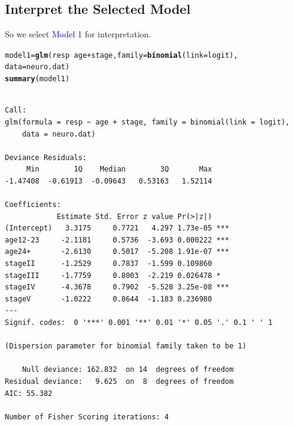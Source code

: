\documentclass{article}\usepackage[]{graphicx}\usepackage[svgnames]{xcolor}
\makeatletter
\newcommand{\hlopt}[1]{\textcolor[rgb]{0,0,0}{#1}}%
\newcommand{\hlstd}[1]{\textcolor[rgb]{0.345,0.345,0.345}{#1}}%
\newcommand{\hlkwb}[1]{\textcolor[rgb]{0.69,0.353,0.396}{#1}}%
\newcommand{\hlkwc}[1]{\textcolor[rgb]{0.333,0.667,0.333}{#1}}%
\newcommand{\hlkwd}[1]{\textcolor[rgb]{0.737,0.353,0.396}{\textbf{#1}}}%
\newenvironment{kframe}{%
 \def\at@end@of@kframe{}%
 \ifinner\ifhmode%
  \def\at@end@of@kframe{\end{minipage}}%
  \begin{minipage}{\columnwidth}%
 \fi\fi%
 \def\FrameCommand##1{\hskip\@totalleftmargin \hskip-\fboxsep
 \colorbox{shadecolor}{##1}\hskip-\fboxsep
     \hskip-\linewidth \hskip-\@totalleftmargin \hskip\columnwidth}%
 \MakeFramed {\advance\hsize-\width
   \@totalleftmargin\z@ \linewidth\hsize
   \@setminipage}}%
 {\par\unskip\endMakeFramed%
 \at@end@of@kframe}
\newenvironment{knitrout}{}{} %
\makeatother
\begin{document}
\subsection*{Interpret the Selected Model}
So we select \textcolor{Blue}{Model 1} for interpretation.
\begin{knitrout}
\color{fgcolor}\begin{kframe}
\begin{alltt}
\hlstd{model1} \hlkwb{=} \hlkwd{glm}\hlstd{(resp} \hlopt{~} \hlstd{age} \hlopt{+} \hlstd{stage,} \hlkwc{family} \hlstd{=} \hlkwd{binomial}\hlstd{(}\hlkwc{link} \hlstd{= logit),}
  \hlkwc{data} \hlstd{= neuro.dat)}
\hlkwd{summary}\hlstd{(model1)}
\end{alltt}
\begin{verbatim}

Call:
glm(formula = resp ~ age + stage, family = binomial(link = logit), 
    data = neuro.dat)

Deviance Residuals: 
     Min        1Q    Median        3Q       Max  
-1.47408  -0.61913  -0.09643   0.53163   1.52114  

Coefficients:
            Estimate Std. Error z value Pr(>|z|)    
(Intercept)   3.3175     0.7721   4.297 1.73e-05 ***
age12-23     -2.1181     0.5736  -3.693 0.000222 ***
age24+       -2.6130     0.5017  -5.208 1.91e-07 ***
stageII      -1.2529     0.7837  -1.599 0.109860    
stageIII     -1.7759     0.8003  -2.219 0.026478 *  
stageIV      -4.3678     0.7902  -5.528 3.25e-08 ***
stageV       -1.0222     0.8644  -1.183 0.236980    
---
Signif. codes:  0 '***' 0.001 '**' 0.01 '*' 0.05 '.' 0.1 ' ' 1

(Dispersion parameter for binomial family taken to be 1)

    Null deviance: 162.832  on 14  degrees of freedom
Residual deviance:   9.625  on  8  degrees of freedom
AIC: 55.382

Number of Fisher Scoring iterations: 4
\end{verbatim}
\end{kframe}
\end{knitrout}
\end{document}
